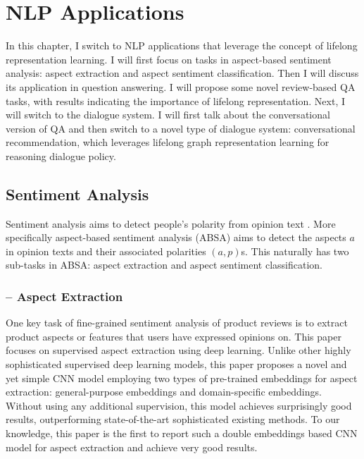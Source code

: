 \chapter{NLP Applications}
\label{chap6:nlp}

In this chapter, I switch to NLP applications that leverage the concept of lifelong representation learning.
I will first focus on tasks in aspect-based sentiment analysis: aspect extraction and aspect sentiment classification.
Then I will discuss its application in question answering.
I will propose some novel review-based QA tasks, with results indicating the importance of lifelong representation.
Next, I will switch to the dialogue system.
I will first talk about the conversational version of QA and then switch to a novel type of dialogue system: conversational recommendation, which leverages lifelong graph representation learning for reasoning dialogue policy.

\section{Sentiment Analysis}
\label{chap6:sec:sa}

Sentiment analysis aims to detect people's polarity from opinion text \cite{Liu2012}.
More specifically aspect-based sentiment analysis (ABSA) aims to detect the aspects $a$ in opinion texts and their associated polarities $(a, p)$s.
This naturally has two sub-tasks in ABSA: aspect extraction and aspect sentiment classification.

\subsection{-- Aspect Extraction}

One key task of fine-grained sentiment analysis of product reviews is to extract product aspects or features that users have expressed opinions on. This paper focuses on supervised aspect extraction using deep learning. Unlike other highly sophisticated supervised deep learning models, this paper proposes a novel and yet simple CNN model employing two types of pre-trained embeddings for aspect extraction: general-purpose embeddings and domain-specific embeddings. Without using any additional supervision, this model achieves surprisingly good results, outperforming state-of-the-art sophisticated existing methods. To our knowledge, this paper is the first to report such a double embeddings based CNN model for aspect extraction and achieve very good results. 


